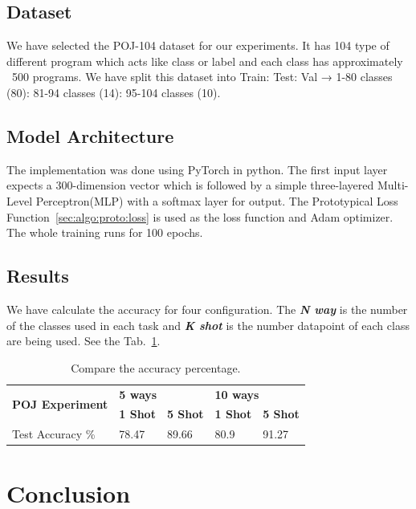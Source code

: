 \subsection{Dataset}
We have selected the POJ-104 dataset\cite{tbcnn-aaai16} for our experiments. It has 104 type of different program which acts like class or label and each class has approximately ~500 programs. We have split this dataset into Train: Test: Val →  1-80 classes (80): 81-94 classes (14): 95-104 classes (10).

\subsection{Model Architecture}
The implementation was done using PyTorch in python. The first input layer expects a 300-dimension vector which is followed by a simple three-layered Multi-Level Perceptron(MLP) with a softmax layer for output. The Prototypical Loss Function~\ref{sec:algo:proto:loss} is used as the loss function and Adam optimizer. The whole training runs for 100 epochs.

\subsection{Results}
We have calculate the accuracy for four configuration. The \textit{\textbf{N way}} is the number of the classes used in each task and \textit{\textbf{K shot}} is the number datapoint  of each class are being used. See the Tab.~\ref{tab:unsupervised-acc}.
\begin{table}[h]
\begin{tabular}{lllll}
\hline
\multirow{2}{*}{\textbf{POJ Experiment}} & \multicolumn{2}{l}{\textbf{5 ways}} & \multicolumn{2}{l}{\textbf{10 ways}} \\
 & \textbf{1 Shot} & \textbf{5 Shot} & \textbf{1 Shot} & \textbf{5 Shot} \\
\hline
Test Accuracy \% & 78.47 & 89.66 & 80.9 & 91.27 \\
\hline
\end{tabular}
\centering
\caption{Compare the accuracy percentage.}
\label{tab:unsupervised-acc}
\end{table}


\section{Conclusion}\label{sec:algo:conclusion}
